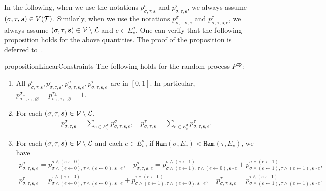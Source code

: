 \documentclass[11pt]{article}
\def\!#1{\mathtt{#1}}
\newcommand{\seqS}{\boldsymbol{s}}
\begin{document}
In the following, when we use the notations $p^{\sigma}_{\sigma, \tau, \seqS}$ and $p^{\tau}_{\sigma, \tau, \seqS}$,
we always assume  $(\sigma,\tau,\seqS)\in V(\+T)$.
Similarly, when we use the notations $p^{\sigma}_{\sigma, \tau, \seqS, e}$ and $p^{\tau}_{\sigma, \tau, \seqS, e}$, we always assume  $(\sigma,\tau,\seqS)\in \+V \setminus \+L$ and $e\in E_{v}^{\sigma}$.
One can verify that the following proposition holds for the above quantities. The proof of the proposition is deferred to~.


    \begin{restatable}{proposition}{LinearConstraints}\label{prop:coupling-linear-constraint}
    The following holds for the random process $P^{\!{cp}}$:
        \begin{enumerate}[(1)]
            \item All $p^{\sigma}_{\sigma, \tau, \seqS}, p^{\tau}_{\sigma, \tau, \seqS},p^{\sigma}_{\sigma, \tau, \seqS,e}, p^{\tau}_{\sigma, \tau, \seqS,e}$ are in $[0, 1]$. 
            In particular, $p^{\sigma_\bot}_{\sigma_\bot, \tau_\bot, \varnothing} = p^{\tau_\bot}_{\sigma_\bot, \tau_\bot, \varnothing} = 1$.
            \item For each $(\sigma, \tau, \seqS)\in \+V\setminus\+L$, 
            \begin{align}\label{eqn-inter-sum1}
               p^{\sigma}_{\sigma,\tau,\seqS} = \sum_{e \in E_v^{\sigma}} p^{\sigma}_{\sigma, \tau, \seqS, e}, \quad  p^{\tau}_{\sigma,\tau,\seqS}=\sum_{e \in  E_v^{\sigma}} p^{\tau}_{\sigma,\tau, \seqS, e}.
            \end{align}
            \item For each $(\sigma, \tau, \seqS)\in \+V\setminus\+L$ and each $e\in E_v^{\sigma}$, if {${\!{Ham}\left(\sigma, {E_v}\right)} < {\!{Ham}\left(\tau,{E_v}\right)}$}, we have 
            \begin{align}\label{eqn-inner-child-sum1}
                p^{\sigma}_{\sigma,\tau, \seqS,e} = p^{\sigma \land (e\gets 0)}_{\sigma \land (e\gets 0),\tau\land (e\gets 0), \seqS \circ e}, \quad  p^{\sigma}_{\sigma, \tau, \seqS, e}=p^{\sigma\land (e\gets 1)}_{\sigma\land (e\gets 1),\tau\land (e\gets 0), \seqS\circ e} + p^{\sigma\land (e\gets 1)}_{\sigma\land (e\gets 1),\tau\land (e\gets 1),\seqS \circ e},
            \end{align}
            \begin{align}\label{eqn-inner-child-sum2}
                p^{\tau}_{\sigma, \tau, \seqS, e} = p^{\tau \land (e \gets 0)}_{\sigma \land (e\gets 0),\tau\land (e\gets 0), \seqS \circ e} + p^{\tau\land (e\gets 0)}_{\sigma\land (e\gets 1),\tau\land (e\gets 0), \seqS \circ e}, \quad  p^{\tau}_{\sigma, \tau, \seqS, e}=p^{\tau \land (e\gets 1)}_{\sigma \land (e\gets 1), \tau\land (e \gets 1), \seqS\circ e}.

\end{align}
\end{enumerate}
\end{restatable}
\end{document}
